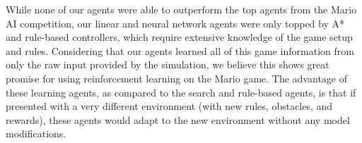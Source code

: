 \documentclass[12pt]{article}
\begin{document}
While none of our agents were able to outperform the top agents from the Mario AI competition, our linear and neural network agents were only topped by A* and rule-based controllers, which require extensive knowledge of the game setup and rules. Considering that our agents learned all of this game information from only the raw input provided by the simulation, we believe this shows great promise for using reinforcement learning on the Mario game. The advantage of these learning agents, as compared to the search and rule-based agents, is that if presented with a very different environment (with new rules, obstacles, and rewards), these agents would adapt to the new environment without any model modifications.


\printbibliography
\end{document}
